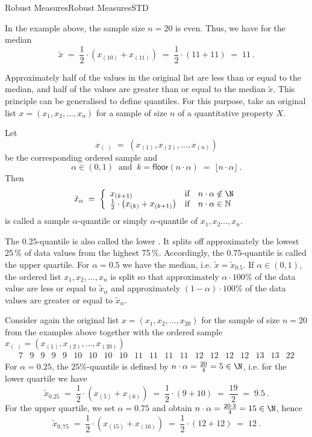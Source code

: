 \begin{MXContent}{Robust Measures}{Robust Measures}{STD}
\begin{MExample}
In the example above, the sample size $n=20$ is even. Thus, we have for the median
$$
\tilde{x}\; =\; \frac{1}{2}\cdot \left({x_{(10)}+x_{(11)} }\right)\; =\;\frac{1}{2}\cdot (11 + 11)\; =\; 11\: .
$$
\end{MExample}

Approximately half of the values in the original list are less than or equal to the median, and half of the 
values are greater than or equal to the median $\tilde{x}$. This principle can be generalised to define quantiles. 
For this purpose, take an original list $x=(x_{1},x_{2},\ldots ,x_{n})$ for a sample of size $n$ of a 
quantitative property $X$.

\begin{MInfo}
Let
$$
x_{(\; )}\; =\; (x_{(1)},x_{(2)},\ldots ,x_{(n)})
$$
be the corresponding ordered sample and 
$$
\alpha \in (0,1) \;\;\text{and} \;\; k = \textsf{floor}(n\cdot \alpha) \;= \;\lfloor n\cdot \alpha \rfloor\: .
$$
Then 
$$
\tilde{x}_{\alpha }\; =\; \left\lbrace{\begin{array}{lll}x_{(k+1)} & \text{if} & n\cdot \alpha \notin \N \\ \frac{1}{2} \cdot \left(x_{(k)}+x_{(k+1)}\right) & \text{if} & n\cdot \alpha \in \mathbb{N}\end{array}}\right.
$$
is called a sample $\alpha$-quantile or simply $\alpha$-quantile of $x_{1},x_{2}\ldots ,x_{n}$.
\end{MInfo}

The $0.25$-quantile is also called the lower . It splits off approximately 
the lowest 25\,\% of data values from the highest 75\,\%. Accordingly, the $0.75$-quantile is called 
the upper quartile. For $\alpha = 0.5$ we have the median, i.e. $\tilde{x}=\tilde{x}_{0.5}$.
If $\alpha \in (0,1)$, the ordered list $x_{1},x_{2},\ldots ,x_{n}$ is split so that 
approximately $\alpha\cdot 100\%$ of the data value are less or equal to $\tilde{x}_{\alpha}$ and 
approximately  $(1-\alpha)\cdot 100\%$ of the data values are greater or equal to $\tilde{x}_{\alpha}$.


\begin{MExample}
Consider again the original list $x=(x_{1},x_{2},\ldots ,x_{20})$ for the sample of size $n=20$ from the examples 
above together with the ordered sample $x_{(\; )}=(x_{(1)},x_{(2)},\ldots ,x_{(20)})$
$$
\begin{array}{cccccccccccccccccccc} 7 & 9 & 9 & 9 & 9 & 10 & 10 & 10 & 10 & 11 & 11 & 11 & 11 & 12 & 12 & 12 & 12 & 13 & 13 & 22 \end{array}
$$
For $\alpha = 0.25$, the $25\%$-quantile is defined by $n\cdot \alpha = \frac{20}{4}=5\in \N$, i.e. for the 
lower quartile we have
$$
\tilde{x}_{0.25}\;=\;  \frac{1}{2}\cdot\left( x_{(5)}+x_{(6)} \right)\; =\;\frac{1}{2}\cdot (9+10)\; =\; \frac{19}{2}\; =\; 9.5\: .
$$
For the upper quartile, we set $\alpha = 0.75$ and obtain 
$n\cdot \alpha = \frac{20\cdot 3}{4}=15\in \N$, hence
$$
\tilde{x}_{0,75}\;=\;\frac{1}{2}\cdot\left( x_{(15)}+x_{(16)} \right) \;=\;\frac{1}{2}\cdot (12+12)\;=\;12\: .
$$
\end{MExample}


\end{MXContent}
